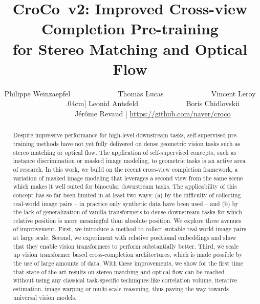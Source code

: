 \documentclass[10pt,twocolumn,letterpaper]{article}
\newcommand{\croconew}{CroCo~v2\xspace}
\begin{document}
\title{\croconew: Improved Cross-view Completion Pre-training \\ 
for Stereo Matching and Optical Flow \vspace{-0.1cm}}

\author{Philippe Weinzaepfel ~~~~~~~~~~~~ Thomas Lucas ~~~~~~~~~~~~ Vincent Leroy ~~~~~~~~~~~~ 
\0.04cm] Leonid Antsfeld ~~~~~~~~~~~~ Boris Chidlovskii ~~~~~~~~~~~~ J\'er\^ome Revaud \-0.05cm]
{\small \url{https://github.com/naver/croco} }
\vspace{-0.4cm}
}


\maketitle



\begin{abstract}
Despite impressive performance for high-level downstream tasks, self-supervised pre-training methods have not yet fully delivered on dense geometric vision tasks such as stereo matching or optical flow.
The application of self-supervised 
concepts, such as instance discrimination or masked image modeling, to geometric tasks is an active area of research.
In this work, we build on the recent cross-view completion framework,
a variation of masked image modeling that leverages a second view from the same scene which makes it well suited for binocular downstream tasks.
The applicability of this concept has so far been limited in at least two ways: (a) by the difficulty of collecting real-world image pairs -- in practice only synthetic data have been used -- 
and (b) by the lack of generalization of vanilla transformers to dense downstream tasks 
for which relative position is more meaningful than absolute position.
We explore three avenues of improvement. 
First, we introduce a method to collect suitable real-world image pairs at large scale.
Second, we experiment with relative positional embeddings and show that they enable vision transformers 
to perform substantially better.
 Third, we scale up vision transformer based cross-completion architectures, which is made possible by the use of large amounts of 
 data.
With these improvements, we show for the first time that state-of-the-art results on 
stereo matching and optical flow can be reached without using any classical task-specific techniques like 
correlation volume, iterative estimation, image warping or multi-scale reasoning, thus paving the way towards universal vision models.
\end{abstract}
\end{document}

